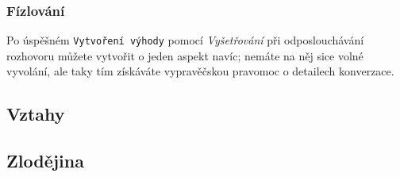 \subsubsection{Fízlování}
\label{sec:vysetrovani-fizlovani}

Po úspěšném \texttt{Vytvoření výhody} pomocí \textit{Vyšetřování} při odposlouchávání rozhovoru můžete vytvořit o jeden aspekt navíc; nemáte na něj sice volné vyvolání, ale taky tím získáváte vypravěčskou pravomoc o detailech konverzace.



\subsection{Vztahy}
\label{sec:trik-vztahy}

\subsection{Zlodějina}
\label{sec:trik-zlodejina}




